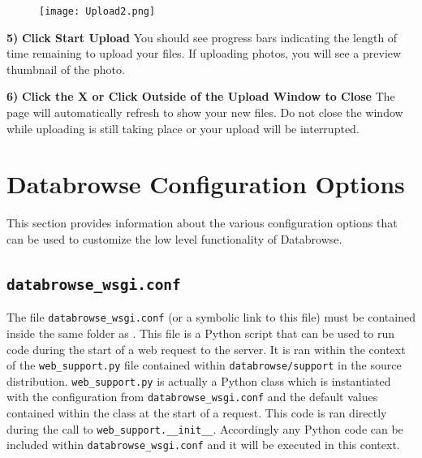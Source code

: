 \documentclass[10pt]{article}
\begin{document}
\endgroup

\hfill \break

\begingroup
\setlength\intextsep{0pt}
\begin{figure}
		\texttt{[image: Upload2.png]}
\end{figure}
\noindent\textbf{5)} \textbf{Click Start Upload} \newline You should see progress bars indicating the length of time remaining to upload your files.  If uploading photos, you will see a preview thumbnail of the photo. 

\endgroup

\hfill \break
\hfill \break
\hfill \break
\hfill \break

\begin{changemargin}{0in}{150.4pt}
\noindent\textbf{6)} \textbf{Click the X or Click Outside of the Upload Window to Close} \newline The page will automatically refresh to show your new files.  Do not close the window while uploading is still taking place or your upload will be interrupted.
\end{changemargin}


\clearpage
\section{Databrowse Configuration Options}
\label{ConfigOptions}

This section provides information about the various configuration options that can be used to customize the low level functionality of Databrowse.

\subsection{\texttt{databrowse\_wsgi.conf}}

The file \texttt{databrowse\_wsgi.conf} (or a symbolic link to this file) must be contained inside the same folder as .  This file is a Python script that can be used to run code during the start of a web request to the server.  It is ran within the context of the \texttt{web\_support.py} file contained within \texttt{databrowse/support} in the source distribution.  \texttt{web\_support.py} is actually a Python class which is instantiated with the configuration from \texttt{databrowse\_wsgi.conf} and the default values contained within the class at the start of a request.  This code is ran directly during the call to \texttt{web\_support.\_\_init\_\_}.  Accordingly any Python code can be included within \texttt{databrowse\_wsgi.conf} and it will be executed in this context.
\end{document}
